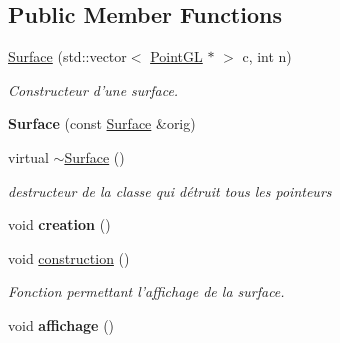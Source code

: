 \subsection*{Public Member Functions}
\begin{DoxyCompactItemize}
\item 
\hyperlink{classSurface_ade400cdb9710332c4b0902fc8c385376}{Surface} (std\-::vector$<$ \hyperlink{classPointGL}{Point\-G\-L} $\ast$ $>$ c, int n)
\begin{DoxyCompactList}\small\item\em Constructeur d'une surface. \end{DoxyCompactList}\item 
\hypertarget{classSurface_a81c20bc2a06703270cd283cecb27580b}{{\bfseries Surface} (const \hyperlink{classSurface}{Surface} \&orig)}\label{classSurface_a81c20bc2a06703270cd283cecb27580b}

\item 
\hypertarget{classSurface_a89de75c95cb550d432f3ea4ed1429db0}{virtual \hyperlink{classSurface_a89de75c95cb550d432f3ea4ed1429db0}{$\sim$\-Surface} ()}\label{classSurface_a89de75c95cb550d432f3ea4ed1429db0}

\begin{DoxyCompactList}\small\item\em destructeur de la classe qui détruit tous les pointeurs \end{DoxyCompactList}\item 
\hypertarget{classSurface_a94c47bc99a994cd62fe0307841981d32}{void {\bfseries creation} ()}\label{classSurface_a94c47bc99a994cd62fe0307841981d32}

\item 
\hypertarget{classSurface_a1beede80574f15acea63245d8c1149a3}{void \hyperlink{classSurface_a1beede80574f15acea63245d8c1149a3}{construction} ()}\label{classSurface_a1beede80574f15acea63245d8c1149a3}

\begin{DoxyCompactList}\small\item\em Fonction permettant l'affichage de la surface. \end{DoxyCompactList}\item 
\hypertarget{classSurface_a5ea70201b07edf77ea1ce99f1a088447}{void {\bfseries affichage} ()}\label{classSurface_a5ea70201b07edf77ea1ce99f1a088447}

\end{DoxyCompactItemize}
